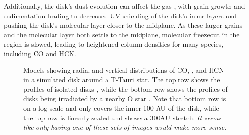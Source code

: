 Additionally, the disk's dust evolution can affect the gas \citep{Fogel2011,Akimkin2013}, with grain growth and sedimentation leading to decreased UV shielding of the disk's inner layers and pushing the disk's molecular layer closer to the midplane. As these larger grains and the molecular layer both settle to the midplane, molecular freezeout in the region is slowed, leading to heightened column densities for many species, including CO and HCN.



\begin{figure}[t]
  \hspace*{\fill}%
  \vfill%
  \hspace*{\fill}%
  \caption{Models showing radial and vertical distributions of CO, \hco, and HCN in a simulated disk around a T-Tauri star. The top row shows the profiles of isolated disks \citep{Walsh2010}, while the bottom row shows the profiles of disks being irradiated by a nearby O star \citep{Walsh2013}. Note that bottom row is on a log scale and only covers the inner 100 AU of the disk, while the top row is linearly scaled and shows a 300AU stretch. \textit{It seems like only having one of these sets of images would make more sense.}}
  \label{fig:walsh-abundance-profs}
\end{figure}




